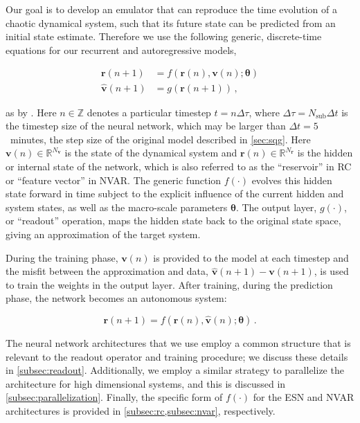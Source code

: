 \documentclass[draft]{agujournal2019}
\newcommand{\state}{\mathbf{v}}
\newcommand{\hidden}{\mathbf{r}}
\newcommand{\hiddenlayer}{f}
\newcommand{\outputlayer}{g}
\newcommand{\hyperparameters}{\bm{\theta}}
\newcommand{\nstate}{N_{\state}}
\newcommand{\nhidden}{N_{\hidden}}
\newcommand{\nsub}{N_\text{sub}}
\newcommand{\statespace}{\mathbb{R}^{\nstate}}
\newcommand{\hiddenspace}{\mathbb{R}^{\nhidden}}
\newcommand{\citet}{\citeA}
\begin{document}
Our goal is to develop an emulator that can reproduce the time evolution of a chaotic dynamical system, such that its future state can be predicted from an initial
state estimate.
Therefore we use the following generic, discrete-time equations for our recurrent and autoregressive models,
\begin{linenomath*}\begin{equation}
    \begin{aligned}
        \hidden(n+1) &= \hiddenlayer\left(
            \hidden(n), \state(n); \hyperparameters
            \right) \\
        \hat{\state}(n+1) &= \outputlayer \left( \hidden(n+1) \right) \, ,
    \end{aligned}
    \label{eq:rnn}
\end{equation}\end{linenomath*}
as by \citet{goodfellow_sequence_2016}.
Here $n\in\mathbb{Z}$ denotes a particular timestep $t = n\Delta \tau$, where $\Delta\tau = \nsub\Delta t$ is the timestep size of the neural network,
which may be larger than $\Delta t=5$~minutes, the step size of the original model described in
\cref{sec:sqg}.
Here $\state(n)\in\statespace$ is the state of the dynamical system and $\hidden(n)\in\hiddenspace$ is the hidden or internal state of the network, which is also referred to as the ``reservoir'' in RC or ``feature vector'' in
NVAR.
The generic function $\hiddenlayer(\cdot)$ evolves this hidden state forward in
time subject to the explicit
influence of the current hidden and system states, as well as the macro-scale
parameters $\hyperparameters$.
The output layer,
$\outputlayer(\cdot)$, or ``readout'' operation,
maps the hidden state back to the original state space, giving an
approximation of the target system.

During the training phase, $\state(n)$ is provided to the model at each timestep
and the misfit between the approximation and data,
$\hat{\state}(n+1) - \state(n+1)$, is used to train the weights in the output
layer.
After training, during the prediction phase, the network becomes an autonomous
system:
\begin{linenomath*}\begin{equation*}
    \hidden(n+1) = \hiddenlayer\left(
        \hidden(n), \hat{\state}(n); \hyperparameters\right) \, .
\end{equation*}\end{linenomath*}

The neural network architectures that we use employ a common
structure that is relevant to the readout operator and training
procedure; we discuss these details in \cref{subsec:readout}.
Additionally, we employ a similar strategy to parallelize the architecture for
high dimensional systems, and this is discussed in
\cref{subsec:parallelization}.
Finally, the specific form of $\hiddenlayer(\cdot)$ for the ESN and NVAR architectures
is provided in \cref{subsec:rc,subsec:nvar},
respectively.
\end{document}
